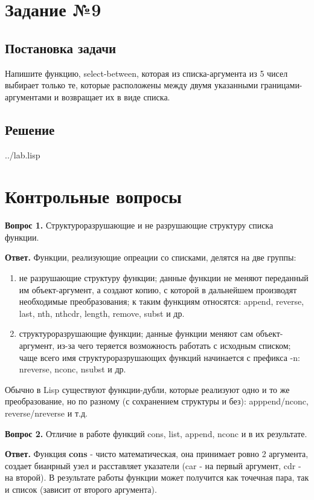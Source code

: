 \section*{Задание №9}
\subsection*{Постановка задачи}
Напишите функцию, select-between, которая из списка-аргумента из 5 чисел выбирает
только те, которые расположены между двумя указанными границами-аргументами и
возвращает их в виде списка.

\subsection*{Решение}
\begin{lstinputlisting}[label=third,caption=Решение задания №9, language=lisp, firstline=104, lastline=110]{../lab.lisp}
\end{lstinputlisting}

\section*{Контрольные вопросы}
\textbf{Вопрос 1.} Структуроразрушающие и не разрушающие структуру списка функции.

\textbf{Ответ.}
Функции, реализующие опреации со списками, делятся на две группы:
\begin{enumerate}
	\item не разрушающие структуру функции; данные функции не меняют переданный им объект-аргумент, а создают копию, с которой в дальнейшем производят необходимые преобразования; к таким функциям относятся: append, reverse, last, nth, nthcdr, length, remove, subst и др.
	\item структуроразрушающие функции; данные функции меняют сам объект-аргумент, из-за чего теряется возможность работать с исходным списком; чаще всего имя структуроразрушающих функций начинается с префикса -n: nreverse, nconc, nsubst и др.
\end{enumerate}

Обычно в Lisp существуют функции-дубли, которые реализуют одно и то же преобразование, но по разному (с сохранением структуры и без): apppend/nconc, reverse/nreverse и т.д.\newline

\textbf{Вопрос 2.} Отличие в работе функций cons, list, append, nconc и в их результате.

\textbf{Ответ.}
Функция \textbf{cons} - чисто математическая, она принимает ровно 2 аргумента, создает бианрный узел и расставляет указатели (car - на первый аргумент, cdr - на второй). В результате работы функции может получится как точечная пара, так и список (зависит от второго аргумента).\\


